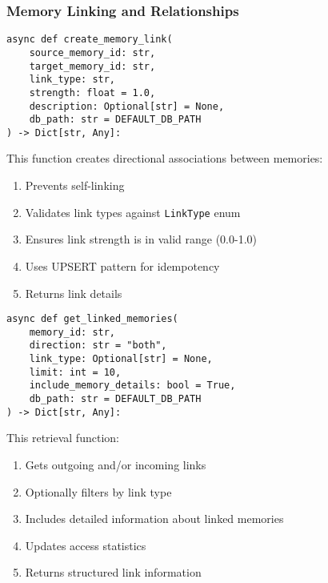 \documentclass[12pt,a4paper]{article}
\newcommand{\code}[1]{\texttt{#1}}
\begin{document}
\subsubsection*{Memory Linking and Relationships}
\begin{pageablecode}
\begin{verbatim}
async def create_memory_link(
    source_memory_id: str,
    target_memory_id: str,
    link_type: str,
    strength: float = 1.0,
    description: Optional[str] = None,
    db_path: str = DEFAULT_DB_PATH
) -> Dict[str, Any]:
\end{verbatim}
\end{pageablecode}
This function creates directional associations between memories:
\begin{enumerate}[label=\arabic*.]
    \item Prevents self-linking
    \item Validates link types against \code{LinkType} enum
    \item Ensures link strength is in valid range (0.0-1.0)
    \item Uses UPSERT pattern for idempotency
    \item Returns link details
\end{enumerate}

\begin{pageablecode}
\begin{verbatim}
async def get_linked_memories(
    memory_id: str,
    direction: str = "both",
    link_type: Optional[str] = None,
    limit: int = 10,
    include_memory_details: bool = True,
    db_path: str = DEFAULT_DB_PATH
) -> Dict[str, Any]:
\end{verbatim}
\end{pageablecode}
This retrieval function:
\begin{enumerate}[label=\arabic*.]
    \item Gets outgoing and/or incoming links
    \item Optionally filters by link type
    \item Includes detailed information about linked memories
    \item Updates access statistics
    \item Returns structured link information
\end{enumerate}
\end{document}
